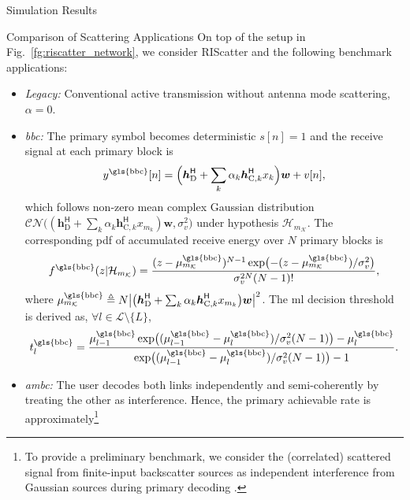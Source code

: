 \documentclass[journal,12pt,onecolumn,draftclsnofoot]{IEEEtran}
\theoremstyle{remark}
\begin{document}
\begin{section}{Simulation Results}
	\begin{subsection}{Comparison of Scattering Applications}
		On top of the setup in Fig.~\ref{fg:riscatter_network}, we consider RIScatter and the following benchmark applications:
		\begin{itemize}
			\item \emph{Legacy:} Conventional active transmission without antenna mode scattering, $\alpha=0$.
			\item \emph{\gls{bbc}:} The primary symbol becomes deterministic $s[n]=1$ and the receive signal at each primary block is
			\begin{equation}
				y^{\text{\gls{bbc}}}[n] = \Bigl(\boldsymbol{h}_{\text{D}}^\mathsf{H} + \sum_{k} \alpha_k \boldsymbol{h}_{\text{C},k}^\mathsf{H} x_k\Bigr) \boldsymbol{w} + v[n],
			\end{equation}
			which follows non-zero mean complex Gaussian distribution $\mathcal{CN}\bigl((\boldsymbol{h}_{\text{D}}^\mathsf{H} + \sum_{k} \alpha_k \boldsymbol{h}_{\text{C},k}^\mathsf{H} x_{m_k}) \boldsymbol{w},\sigma_v^2\bigr)$ under hypothesis $\mathcal{H}_{m_{\mathcal{K}}}$.
			The corresponding \gls{pdf} of accumulated receive energy over $N$ primary blocks is
			\begin{equation}
				f^{\text{\gls{bbc}}}(z|\mathcal{H}_{m_{\mathcal{K}}}) = \frac{(z-\mu_{m_{\mathcal{K}}}^{\text{\gls{bbc}}})^{N-1} \exp \bigl(-(z-\mu_{m_{\mathcal{K}}}^{\text{\gls{bbc}}})/\sigma_v^2 \bigr)}{\sigma_v^{2N} (N-1)!},
				\label{eq:energy_distribution_bbc}
			\end{equation}
			where $\mu_{m_{\mathcal{K}}}^{\text{\gls{bbc}}} \triangleq N \bigl\lvert \bigl(\boldsymbol{h}_{\text{D}}^\mathsf{H} + \sum_{k} \alpha_k \boldsymbol{h}_{\text{C},k}^\mathsf{H} x_{m_k}\bigr) \boldsymbol{w} \bigr\rvert^2$.
			The \gls{ml} decision threshold is derived as, $\forall l \in \mathcal{L} \setminus \{L\}$,
			\begin{equation}
				t_l^{\text{\gls{bbc}}} = \frac{\mu_{l-1}^{\text{\gls{bbc}}} \exp \bigl((\mu_{l-1}^{\text{\gls{bbc}}}-\mu_{l}^{\text{\gls{bbc}}})/\sigma_v^2 (N-1)\bigr) - \mu_{l}^{\text{\gls{bbc}}}}{\exp \bigl((\mu_{l-1}^{\text{\gls{bbc}}}-\mu_{l}^{\text{\gls{bbc}}})/\sigma_v^2 (N-1)\bigr) - 1}.
				\label{eq:detection_threshold_ml_bbc}
			\end{equation}
			\item \emph{\gls{ambc}:} The user decodes both links independently and semi-coherently by treating the other as interference.
			Hence, the primary achievable rate is approximately\footnote{To provide a preliminary benchmark, we consider the (correlated) scattered signal from finite-input backscatter sources as independent interference from Gaussian sources during primary decoding \cite{Long2020a}.}

\end{itemize}
\end{subsection}
\end{section}
\end{document}
